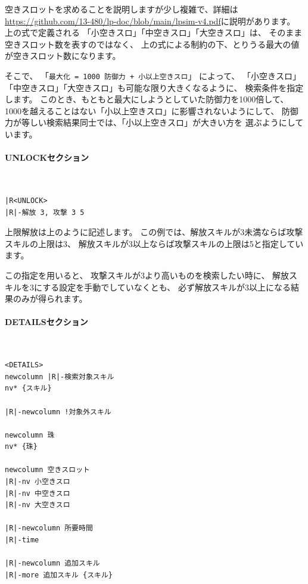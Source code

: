 \documentclass[dvipdfmx]{jsarticle}
\begin{document}
空きスロットを求めることを説明しますが少し複雑で、詳細は
\url{https://github.com/13-480/lp-doc/blob/main/lpsim-v4.pdf}に説明があります。
上の式で定義される
「小空きスロ」「中空きスロ」「大空きスロ」は、
そのまま空きスロット数を表すのではなく、
上の式による制約の下、とりうる最大の値が空きスロット数になります。

そこで、
「\texttt{最大化 = 1000 防御力 + 小以上空きスロ}」
によって、
「小空きスロ」「中空きスロ」「大空きスロ」も可能な限り大きくなるように、
検索条件を指定します。
このとき、もともと最大にしようとしていた防御力を1000倍して、
1000を越えることはない「小以上空きスロ」に影響されないようにして、
防御力が等しい検索結果同士では、「小以上空きスロ」が大きい方を
選ぶようにしています。

\paragraph{UNLOCKセクション}~\medskip
{\footnotesize\begin{mdframed}\begin{Verbatim}[commandchars=|<>]
|R<UNLOCK>
|R|-解放 3, 攻撃 3 5
\end{Verbatim}
\end{mdframed}}
\medskip

上限解放は上のように記述します。
この例では、解放スキルが3未満ならば攻撃スキルの上限は3、
解放スキルが3以上ならば攻撃スキルの上限は5と指定しています。

この指定を用いると、
攻撃スキルが3より高いものを検索したい時に、
解放スキルを3にする設定を手動でしていなくとも、
必ず解放スキルが3以上になる結果のみが得られます。

\paragraph{DETAILSセクション}~\medskip
{\footnotesize\begin{mdframed}\begin{Verbatim}[commandchars=|<>]
<DETAILS>
newcolumn |R|-検索対象スキル
nv* {スキル}

|R|-newcolumn !対象外スキル

newcolumn 珠
nv* {珠}

newcolumn 空きスロット
|R|-nv 小空きスロ
|R|-nv 中空きスロ
|R|-nv 大空きスロ

|R|-newcolumn 所要時間
|R|-time

|R|-newcolumn 追加スキル
|R|-more 追加スキル {スキル}
\end{Verbatim}
\end{mdframed}}
\medskip
\end{document}

